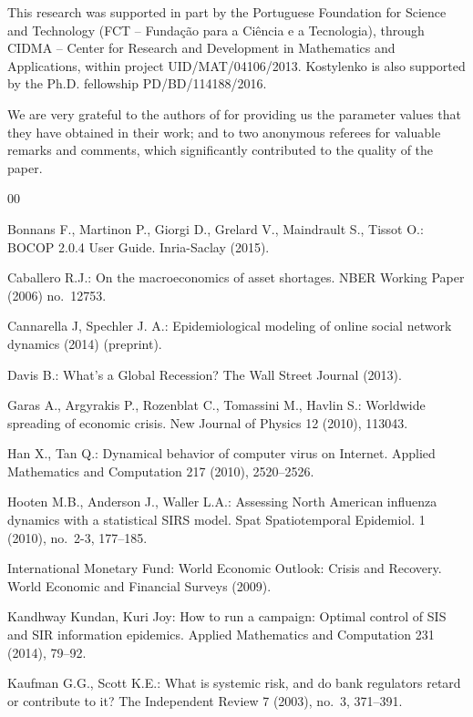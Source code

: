 \documentclass[a4paper,10pt,twoside]{article}
\begin{document}
This research was supported in part by the Portuguese Foundation 
for Science and Technology (FCT -- Funda\c{c}\~{a}o para a Ci\^{e}ncia e a Tecnologia), 
through CIDMA -- Center for Research and Development in Mathematics and Applications, 
within project UID/MAT/04106/2013. Kostylenko is also supported 
by the Ph.D. fellowship PD/BD/114188/2016.

We are very grateful to the authors of \cite{[24]}
for providing us the parameter values that they have obtained
in their work; and to two anonymous referees 
for valuable remarks and comments, which significantly 
contributed to the quality of the paper.
	

\begin{thebibliography}{00}

\bibitem{[25]}
Bonnans F., Martinon P., Giorgi D., Grelard V., Maindrault S., Tissot O.:
BOCOP 2.0.4 User Guide.
Inria-Saclay (2015).
	
\bibitem{[19]}
Caballero R.J.:
On the macroeconomics of asset shortages.
NBER Working Paper (2006) no.~12753.	
	
\bibitem{[6]}
Cannarella J, Spechler J. A.:
Epidemiological modeling of online social network dynamics (2014) (preprint).
			
\bibitem{[17]}
Davis B.: 
What's a Global Recession?
The Wall Street Journal (2013).
			    	
\bibitem{[11]}
Garas A., Argyrakis P., Rozenblat C., Tomassini M., Havlin S.:
Worldwide spreading of economic crisis.
New Journal of Physics 12 (2010), 113043.

\bibitem{[5]}
Han X., Tan Q.:
Dynamical behavior of computer virus on Internet.
Applied Mathematics and Computation 217 (2010), 2520--2526.
		
\bibitem{[1]}
Hooten M.B., Anderson J., Waller L.A.:
Assessing North American influenza dynamics with a statistical SIRS model.
Spat Spatiotemporal Epidemiol. 1 (2010), no.~2-3, 177--185.

\bibitem{[18]}
International Monetary Fund:
World Economic Outlook: Crisis and Recovery.
World Economic and Financial Surveys (2009).
		
\bibitem{[8]}
Kandhway Kundan, Kuri Joy:
How to run a campaign:
Optimal control of SIS and SIR information epidemics.
Applied Mathematics and Computation 231 (2014), 79--92.

\bibitem{[23]}
Kaufman G.G., Scott K.E.:
What is systemic risk, and do bank regulators retard or contribute to it?
The Independent Review 7 (2003), no.~3, 371--391.


\end{thebibliography}
\end{document}
